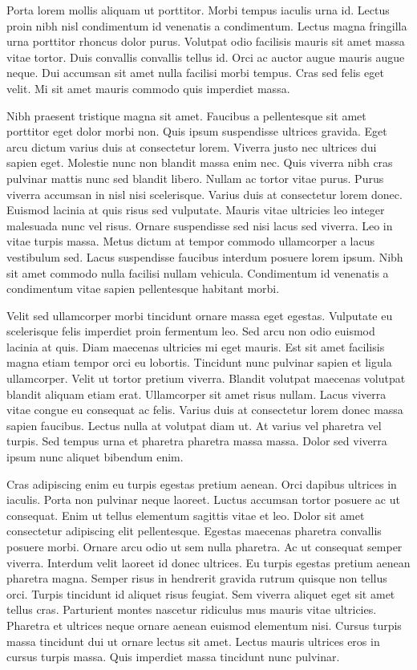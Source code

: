 \documentclass[11pt,a4paper]{article}
\begin{document}
Porta lorem mollis aliquam ut porttitor. Morbi tempus iaculis urna id. Lectus proin nibh nisl condimentum id venenatis a condimentum. Lectus magna fringilla urna porttitor rhoncus dolor purus. Volutpat odio facilisis mauris sit amet massa vitae tortor. Duis convallis convallis tellus id. Orci ac auctor augue mauris augue neque. Dui accumsan sit amet nulla facilisi morbi tempus. Cras sed felis eget velit. Mi sit amet mauris commodo quis imperdiet massa.

Nibh praesent tristique magna sit amet. Faucibus a pellentesque sit amet porttitor eget dolor morbi non. Quis ipsum suspendisse ultrices gravida. Eget arcu dictum varius duis at consectetur lorem. Viverra justo nec ultrices dui sapien eget. Molestie nunc non blandit massa enim nec. Quis viverra nibh cras pulvinar mattis nunc sed blandit libero. Nullam ac tortor vitae purus. Purus viverra accumsan in nisl nisi scelerisque. Varius duis at consectetur lorem donec. Euismod lacinia at quis risus sed vulputate. Mauris vitae ultricies leo integer malesuada nunc vel risus. Ornare suspendisse sed nisi lacus sed viverra. Leo in vitae turpis massa. Metus dictum at tempor commodo ullamcorper a lacus vestibulum sed. Lacus suspendisse faucibus interdum posuere lorem ipsum. Nibh sit amet commodo nulla facilisi nullam vehicula. Condimentum id venenatis a condimentum vitae sapien pellentesque habitant morbi.

Velit sed ullamcorper morbi tincidunt ornare massa eget egestas. Vulputate eu scelerisque felis imperdiet proin fermentum leo. Sed arcu non odio euismod lacinia at quis. Diam maecenas ultricies mi eget mauris. Est sit amet facilisis magna etiam tempor orci eu lobortis. Tincidunt nunc pulvinar sapien et ligula ullamcorper. Velit ut tortor pretium viverra. Blandit volutpat maecenas volutpat blandit aliquam etiam erat. Ullamcorper sit amet risus nullam. Lacus viverra vitae congue eu consequat ac felis. Varius duis at consectetur lorem donec massa sapien faucibus. Lectus nulla at volutpat diam ut. At varius vel pharetra vel turpis. Sed tempus urna et pharetra pharetra massa massa. Dolor sed viverra ipsum nunc aliquet bibendum enim.

Cras adipiscing enim eu turpis egestas pretium aenean. Orci dapibus ultrices in iaculis. Porta non pulvinar neque laoreet. Luctus accumsan tortor posuere ac ut consequat. Enim ut tellus elementum sagittis vitae et leo. Dolor sit amet consectetur adipiscing elit pellentesque. Egestas maecenas pharetra convallis posuere morbi. Ornare arcu odio ut sem nulla pharetra. Ac ut consequat semper viverra. Interdum velit laoreet id donec ultrices. Eu turpis egestas pretium aenean pharetra magna. Semper risus in hendrerit gravida rutrum quisque non tellus orci. Turpis tincidunt id aliquet risus feugiat. Sem viverra aliquet eget sit amet tellus cras. Parturient montes nascetur ridiculus mus mauris vitae ultricies. Pharetra et ultrices neque ornare aenean euismod elementum nisi. Cursus turpis massa tincidunt dui ut ornare lectus sit amet. Lectus mauris ultrices eros in cursus turpis massa. Quis imperdiet massa tincidunt nunc pulvinar.
\end{document}
